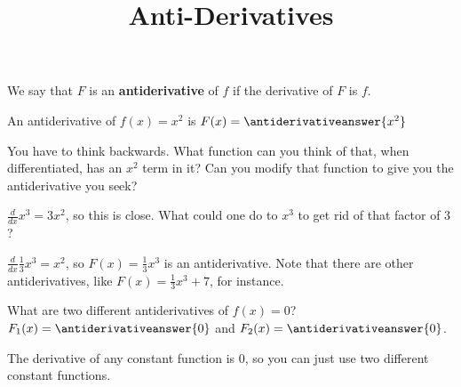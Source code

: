 \documentclass{ximera}
\title[Dig-In:]{Anti-Derivatives}
\begin{document}
\begin{definition}
  We say that $F$ is an \textbf{antiderivative} of $f$ if the derivative of $F$ is $f$.
\end{definition}
	
	
	\begin{question}
		An antiderivative of $f(x) = x^2$ is $F(x) = \antiderivativeanswer{x^2}$
			\begin{hint}
				You have to think backwards.  What function can you think of that, when differentiated, has an $x^2$ term in it?  Can you modify that function to give you the antiderivative you seek?
			\end{hint}
			\begin{hint}
				$\frac{d}{dx} x^3 = 3x^2$, so this is close.  What could one do to $x^3$ to get rid of that factor of $3$?
			\end{hint}
			\begin{hint}
				$\frac{d}{dx} \frac{1}{3} x^3 = x^2$, so $F(x) = \frac{1}{3} x^3$ is an antiderivative.  Note that there are other antiderivatives, like $F(x) = \frac{1}{3}x^3 + 7$, for instance.
			\end{hint}
	\end{question}
	
	\begin{question}
		
		What are two different antiderivatives of $f(x) = 0$?  $F_1(x) =  \antiderivativeanswer{0}$ and $F_2(x) = \antiderivativeanswer{0}$.
		
		\begin{hint}
			The derivative of any constant function is $0$, so you can just use two different constant functions.
		\end{hint}
	\end{question}
	
\end{document}
